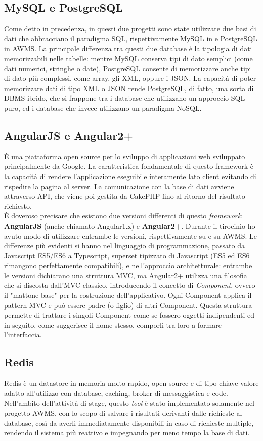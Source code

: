 \subsection{MySQL e PostgreSQL}
Come detto in precedenza, in questi due progetti sono state utilizzate due basi di dati che abbracciano il paradigma SQL, rispettivamente MySQL in \DS{} e PostgreSQL in AWMS.
La principale differenza tra questi due database è la tipologia di dati memorizzabili nelle tabelle: mentre MySQL conserva tipi di dato semplici (come dati numerici, stringhe o date), PostgreSQL consente di memorizzare anche tipi di dato più complessi, come array, gli XML, oppure i JSON.
La capacità di poter memorizzare dati di tipo XML o JSON rende PostgreSQL, di fatto, una sorta di DBMS ibrido, che si frappone tra i database che utilizzano un approccio SQL puro, ed i database che invece utilizzano un paradigma NoSQL. 
\subsection{AngularJS e Angular2+}
\`E una piattaforma open source per lo sviluppo di applicazioni web sviluppato principalmente da Google. La caratteristica fondamentale di questo framework è la capacità di rendere l’applicazione eseguibile interamente lato client evitando di rispedire la pagina al server. La comunicazione con la base di dati avviene attraverso API, che viene poi gestita da CakePHP fino al ritorno del risultato richiesto.\\
\`E doveroso precisare che esistono due versioni differenti di questo \textit{framework}: \textbf{AngularJS} (anche chiamato Angular1.x) e \textbf{Angular2+}. Durante il tirocinio ho avuto modo di utilizzare entrambe le versioni, rispettivamente su \DS{} e su AWMS. 
Le differenze più evidenti si hanno nel linguaggio di programmazione, passato da Javascript ES5/ES6 a Typescript, superset tipizzato di Javascript (ES5 ed ES6 rimangono perfettamente compatibili), e nell'approccio architetturale: entrambe le versioni dichiarano una struttura MVC, ma Angular2+ utilizza una filosofia che si discosta dall'MVC classico, introducendo il concetto di \textit{Component}, ovvero il "mattone base" per la costruzione dell'applicativo.
Ogni Component applica il pattern MVC e può essere padre (o figlio) di altri Component. Questa struttura permette di trattare i singoli Component come se fossero oggetti indipendenti ed in seguito, come suggerisce il nome stesso, comporli tra loro a formare l'interfaccia.
\subsection{Redis}
Redis è un datastore in memoria molto rapido, open source e di tipo chiave-valore adatto all'utilizzo con database, caching, broker di messaggistica e code.\\
Nell'ambito dell'attività di stage, questo \textit{tool} è stato implementato solamente nel progetto AWMS, con lo scopo di salvare i risultati derivanti dalle richieste al database, così da averli immediatamente disponibili in caso di richieste multiple, rendendo il sistema più reattivo e impegnando per meno tempo la base di dati.

